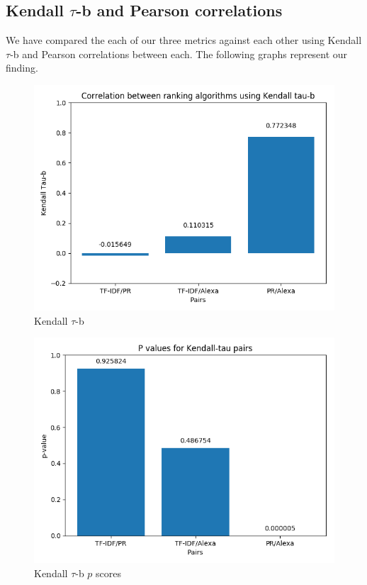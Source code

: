 \documentclass[11pt]{article}
\begin{document}
	\subsection{Kendall $\tau$-b and Pearson correlations}
	\hspace{10mm} We have compared the each of our three metrics against each other using Kendall $\tau$-b and Pearson correlations between each. The following graphs represent our finding. 
	\begin{figure}[H]
		\includegraphics[scale=0.5]{resources/kendall-taub.png}
		\caption{Kendall $\tau$-b}
	\end{figure}
	\begin{figure}[H]
		\includegraphics[scale=0.5]{resources/kendall_taub_p.png}
		\caption{Kendall $\tau$-b $p$ scores}
	\end{figure}
\end{document}
